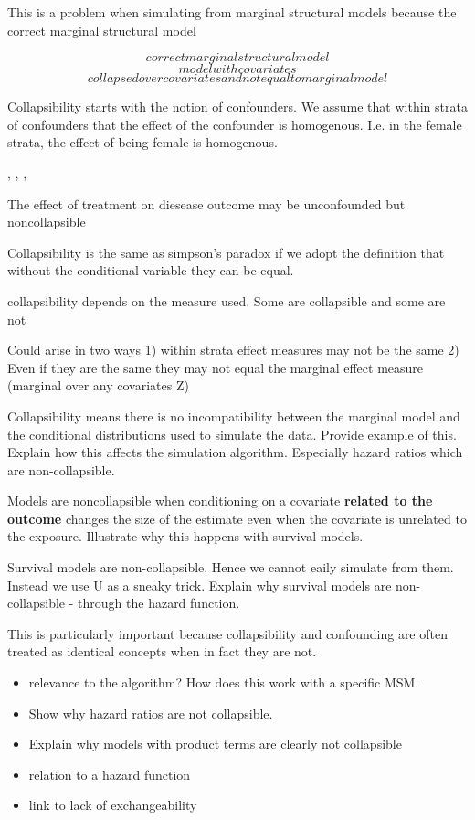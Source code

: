 \documentclass[11pt]{article}
\providecommand{\tightlist}{%
      \setlength{\itemsep}{0pt}\setlength{\parskip}{0pt}}
\begin{document}
This is a problem when simulating from marginal structural models
because the correct marginal structural model

\[correct marginal structural model\] \[model with covariates\]
\[collapsed over covariates and not equal to marginal model\]

Collapsibility starts with the notion of confounders. We assume that
within strata of confounders that the effect of the confounder is
homogenous. I.e. in the female strata, the effect of being female is
homogenous.

\citet{Greenland1996}, \citet{Greenland1999}, \citet{Greenland2011},
\citet{Sjoelander2016}

The effect of treatment on diesease outcome may be unconfounded but
noncollapsible

Collapsibility is the same as simpson's paradox if we adopt the
definition that without the conditional variable they can be equal.

collapsibility depends on the measure used. Some are collapsible and
some are not

Could arise in two ways 1) within strata effect measures may not be the
same 2) Even if they are the same they may not equal the marginal effect
measure (marginal over any covariates Z)

Collapsibility means there is no incompatibility between the marginal
model and the conditional distributions used to simulate the data.
Provide example of this. Explain how this affects the simulation
algorithm. Especially hazard ratios which are non-collapsible.

Models are noncollapsible when conditioning on a covariate
\textbf{related to the outcome} changes the size of the estimate even
when the covariate is unrelated to the exposure. Illustrate why this
happens with survival models.

Survival models are non-collapsible. Hence we cannot eaily simulate from
them. Instead we use U as a sneaky trick. Explain why survival models
are non-collapsible - through the hazard function.

This is particularly important because collapsibility and confounding
are often treated as identical concepts when in fact they are not.
\citet{Greenland1999}

\begin{itemize}
\tightlist
\item
  relevance to the algorithm? How does this work with a specific MSM.
\item
  Show why hazard ratios are not collapsible.
\item
  Explain why models with product terms are clearly not collapsible
\item
  relation to a hazard function
\item
  link to lack of exchangeability
\end{itemize}
\end{document}
